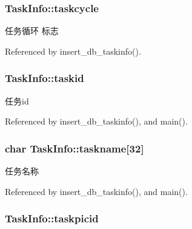 \hypertarget{structTaskInfo_a585a387b5d639defa31bb8511d0c3b48}{
\subsubsection[{taskcycle}]{ Task\-Info\-::taskcycle}}\label{structTaskInfo_a585a387b5d639defa31bb8511d0c3b48}


任务循环 标志 



Referenced by insert\-\_\-db\-\_\-taskinfo().

\hypertarget{structTaskInfo_a27224eae1effa0e80bc2fa52dde59692}{
\subsubsection[{taskid}]{ Task\-Info\-::taskid}}\label{structTaskInfo_a27224eae1effa0e80bc2fa52dde59692}


任务id 



Referenced by insert\-\_\-db\-\_\-taskinfo(), and main().

\hypertarget{structTaskInfo_a93bbd541a14b0eb3be4d81df457f53c0}{
\subsubsection[{taskname}]{\setlength{\rightskip}{0pt plus 5cm}char Task\-Info\-::taskname\mbox{[}32\mbox{]}}}\label{structTaskInfo_a93bbd541a14b0eb3be4d81df457f53c0}


任务名称 



Referenced by insert\-\_\-db\-\_\-taskinfo(), and main().

\hypertarget{structTaskInfo_ab853cd6598db69ad460ab8ae9efa49b6}{
\subsubsection[{taskpicid}]{ Task\-Info\-::taskpicid}}\label{structTaskInfo_ab853cd6598db69ad460ab8ae9efa49b6}


